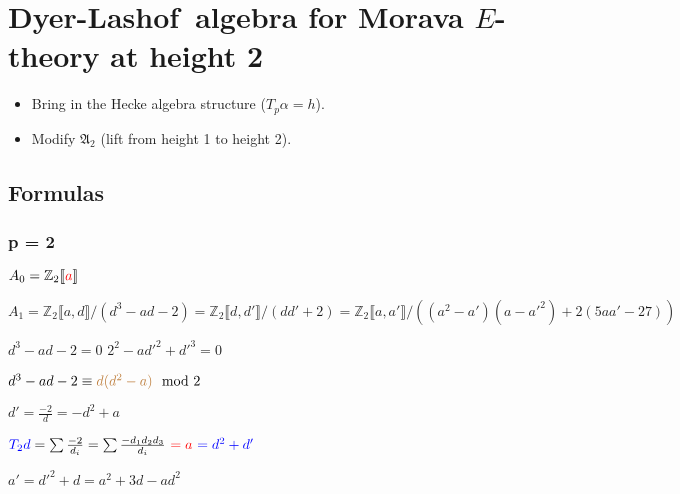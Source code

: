 \documentclass{rs}
\theoremstyle{definition}
\theoremstyle{remark}
\newcommand{\mb}[1]{\mathbb{#1}}
\newcommand{\mf}[1]{\mathfrak{#1}}
\newcommand{\DL}{Dyer-Lashof~}
\newcommand{\BZ}{{\mb Z}}
\newcommand{\md}{~~{\rm mod}~}
\newcommand{\A}{\alpha}
\newcommand{\lb}{\llbracket}
\newcommand{\rb}{\rrbracket}
\numberwithin{equation}{section}
\numberwithin{thm}{section}
\begin{document}
% 
% 
% 
% 
% 
% 
% 
% 
% 
% 
% 
% 
\section{\DL algebra for Morava $E$-theory at height 2}

\begin{itemize}
 \item Bring in the Hecke algebra structure ($T_p \A = h$).  

 \item Modify $\mf A_2$ (lift from height 1 to height 2).  
\end{itemize}


\subsection{Formulas}

\subsubsection*{p = 2}

$A_0 = \BZ_2 \lb \textcolor{red}{a} \rb$ 

$A_1 = \BZ_2 \lb a, d \rb / (d^3 - a d - 2) 
= \BZ_2 \lb d, d' \rb / (d d' + 2) 
= \BZ_2 \lb a, a' \rb / ((a^2 - a') (a - a'^2) + 2 (5 a a' - 27))$ 

$d^3 - a d - 2 = 0$ \hfill $2^2 - a d'^2 + d'^3 = 0$ 

$d^3 - a d - 2 \equiv \textcolor{brown}{d (d^2 - a)} \md 2$ 

$d' = \frac{-2}{d} = -d^2 + a$ 

$\textcolor{blue}{T_2 d} = \sum \frac{-2}{d_i} = \sum \frac{-d_1 d_2 d_3}{d_i} 
~\textcolor{red}{= a} ~\textcolor{blue}{= d^2 + d'}$ 

$a' = d'^2 + d = a^2 + 3 d - a d^2$ 
\end{document}
